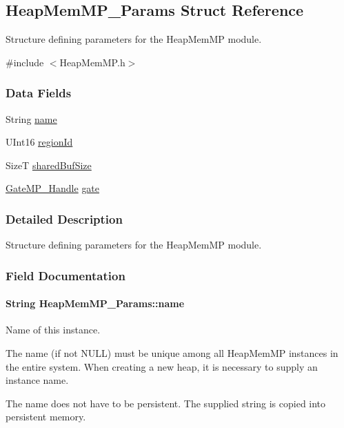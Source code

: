 \subsection{Heap\-Mem\-M\-P\-\_\-\-Params Struct Reference}
\label{struct_heap_mem_m_p___params}


Structure defining parameters for the Heap\-Mem\-M\-P module.  




{\ttfamily \#include $<$Heap\-Mem\-M\-P.\-h$>$}

\subsubsection*{Data Fields}
\begin{DoxyCompactItemize}
\item 
String \hyperlink{struct_heap_mem_m_p___params_a6b71abc682a2b5503fde320e29a1a5f7}{name}
\item 
U\-Int16 \hyperlink{struct_heap_mem_m_p___params_ad1a5b94d015d0b5b75f091ca9be8a04e}{region\-Id}
\item 
Size\-T \hyperlink{struct_heap_mem_m_p___params_a7206d2bd65bf705da74310fd004b67bf}{shared\-Buf\-Size}
\item 
\hyperlink{_gate_m_p_8h_ad5bb259f928a14e98d973334bc60ebb3}{Gate\-M\-P\-\_\-\-Handle} \hyperlink{struct_heap_mem_m_p___params_ab07964aed674d108f19482a0d35e4e46}{gate}
\end{DoxyCompactItemize}


\subsubsection{Detailed Description}
Structure defining parameters for the Heap\-Mem\-M\-P module. 

\subsubsection{Field Documentation}
\paragraph[{name}]{\setlength{\rightskip}{0pt plus 5cm}String Heap\-Mem\-M\-P\-\_\-\-Params\-::name}\label{struct_heap_mem_m_p___params_a6b71abc682a2b5503fde320e29a1a5f7}
Name of this instance. \begin{DoxyVerb}   The name (if not NULL) must be unique among all HeapMemMP
   instances in the entire system.  When creating a new
   heap, it is necessary to supply an instance name.

   The name does not have to be persistent.  The supplied string is copied
   into persistent memory.\end{DoxyVerb}
